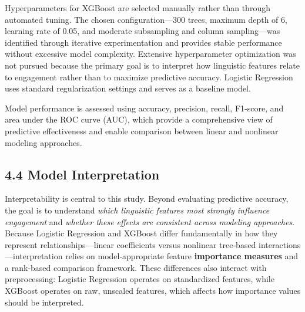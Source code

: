 \documentclass[
]{article}
\begin{document}
Hyperparameters for XGBoost are selected manually rather than through
automated tuning. The chosen configuration---300 trees, maximum depth of
6, learning rate of 0.05, and moderate subsampling and column
sampling---was identified through iterative experimentation and provides
stable performance without excessive model complexity. Extensive
hyperparameter optimization was not pursued because the primary goal is
to interpret how linguistic features relate to engagement rather than to
maximize predictive accuracy. Logistic Regression uses standard
regularization settings and serves as a baseline model.

Model performance is assessed using accuracy, precision, recall,
F1‑score, and area under the ROC curve (AUC), which provide a
comprehensive view of predictive effectiveness and enable comparison
between linear and nonlinear modeling approaches.

\hypertarget{model-interpretation}{%
\subsection{4.4 Model Interpretation}\label{model-interpretation}}

Interpretability is central to this study. Beyond evaluating predictive
accuracy, the goal is to understand \emph{which linguistic features most
strongly influence engagement} and \emph{whether these effects are
consistent across modeling approaches}. Because Logistic Regression and
XGBoost differ fundamentally in how they represent
relationships---linear coefficients versus nonlinear tree‑based
interactions---interpretation relies on model‑appropriate feature
\textbf{importance measures} and a rank‑based comparison framework.
These differences also interact with preprocessing: Logistic Regression
operates on standardized features, while XGBoost operates on raw,
unscaled features, which affects how importance values should be
interpreted.
\end{document}
